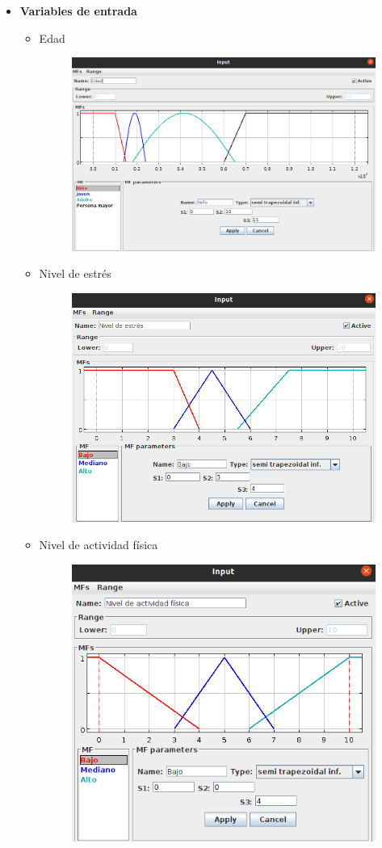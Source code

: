 \documentclass[11pt]{article}
\begin{document}
\begin{itemize}
    \item \textbf{Variables de entrada}
        \begin{itemize}
            \item Edad
            \begin{figure}[h!]
                \begin{center}
                  \includegraphics[width=0.6\linewidth]{edad.png}
                \end{center}
            \end{figure}
            \item Nivel de estrés
            \begin{figure}[h!]
                \begin{center}
                  \includegraphics[width=0.6\linewidth]{estres.png}
                \end{center}
            \end{figure}
            \newpage
            \item Nivel de actividad física
            \begin{figure}[h!]
                \begin{center}
                  \includegraphics[width=0.6\linewidth]{actividad.png}

\end{center}
\end{figure}
\end{itemize}
\end{itemize}
\end{document}
